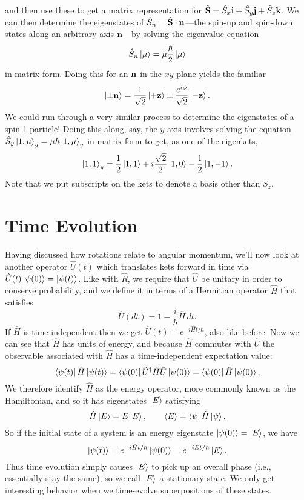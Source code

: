\documentclass[../p116main.tex]{subfiles}
\begin{document}
and then use these to get a matrix representation for $\hat{\mathbf{S}} = \hat S_x \mathbf{i} + \hat S_y \mathbf{j} + \hat S_z \mathbf{k}$.
We can then determine the eigenstates of $\hat S_n = \hat{\mathbf{S}} \cdot \mathbf{n}$---the spin-up and spin-down states along an arbitrary axis $\mathbf{n}$---by solving the eigenvalue equation
\[ \hat S_n \left| \mu \right> = \mu \frac{\hbar}{2} \left| \mu \right> \]
in matrix form.
Doing this for an $\mathbf{n}$ in the $xy$-plane yields the familiar
\[ \left| \pm \mathbf{n} \right> = \frac{1}{\sqrt{2}} \left| +\mathbf{z} \right> \pm \frac{e^{i\phi}}{\sqrt{2}} \left| -\mathbf{z} \right>. \]
We could run through a very similar process to determine the eigenstates of a spin-1 particle!
Doing this along, say, the $y$-axis involves solving the equation $\hat S_y \left| 1, \mu \right>_y = \mu \hbar \left| 1,\mu \right>_y$ in matrix form to get, as one of the eigenkets,
\[ \left| 1,1 \right>_y = \frac{1}{2} \left| 1,1 \right> + i \frac{\sqrt{2}}{2} \left| 1,0 \right> - \frac{1}{2} \left| 1,-1 \right>. \]
Note that we put subscripts on the kets to denote a basis other than $S_z$.

\section{Time Evolution}
Having discussed how rotations relate to angular momentum, we'll now look at another operator $\hat U(t)$ which translates kets forward in time via $\hat U(t) \left| \psi(0) \right> = \left| \psi(t) \right>$.
Like with $\hat R$, we require that $\hat U$ be unitary in order to conserve probability, and we define it in terms of a Hermitian operator $\hat H$ that satisfies
\[ \hat U(dt) = 1 - \frac{i}{\hbar} \hat H \,dt. \]
If $\hat H$ is time-independent then we get $\hat U(t) = e^{-i \hat H t / \hbar}$, also like before.
Now we can see that $\hat H$ has units of energy, and because $\hat H$ commutes with $\hat U$ the observable associated with $\hat H$ has a time-independent expectation value:
\[ \left< \psi(t) \right| \hat H \left| \psi(t) \right> = \left< \psi(0) \right| \hat U^\dagger \hat H \hat U \left| \psi(0) \right> = \left< \psi(0) \right| \hat H \left| \psi(0) \right>. \]
We therefore identify $\hat H$ as the energy operator, more commonly known as the Hamiltonian, and so it has eigenstates $\left| E \right>$ satisfying
\[ \hat H \left| E \right> = E \left| E \right>, \qquad \left< E \right> = \left< \psi \right| \hat H \left| \psi \right>. \]
So if the initial state of a system is an energy eigenstate $\left| \psi(0) \right> = \left| E \right>$, we have
\[ \left| \psi(t) \right> = e^{-i\hat H t / \hbar} \left| \psi(0) \right> = e^{-iEt / \hbar} \left| E \right>. \]
Thus time evolution simply causes $\left| E \right>$ to pick up an overall phase (i.e., essentially stay the same), so we call $\left| E \right>$ a stationary state.
We only get interesting behavior when we time-evolve superpositions of these states.
\end{document}

